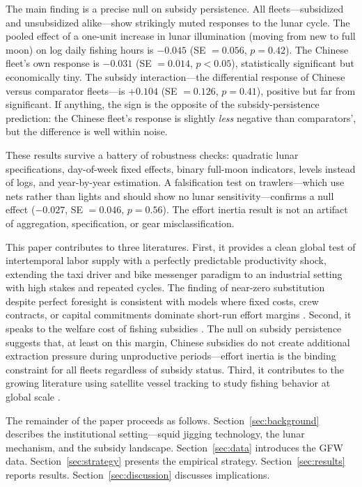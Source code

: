 \documentclass[12pt]{article}
\begin{document}
The main finding is a precise null on subsidy persistence. All fleets---subsidized and unsubsidized alike---show strikingly muted responses to the lunar cycle. The pooled effect of a one-unit increase in lunar illumination (moving from new to full moon) on log daily fishing hours is $-0.045$ (SE $= 0.056$, $p = 0.42$). The Chinese fleet's own response is $-0.031$ (SE $= 0.014$, $p < 0.05$), statistically significant but economically tiny. The subsidy interaction---the differential response of Chinese versus comparator fleets---is $+0.104$ (SE $= 0.126$, $p = 0.41$), positive but far from significant. If anything, the sign is the opposite of the subsidy-persistence prediction: the Chinese fleet's response is slightly \textit{less} negative than comparators', but the difference is well within noise.

These results survive a battery of robustness checks: quadratic lunar specifications, day-of-week fixed effects, binary full-moon indicators, levels instead of logs, and year-by-year estimation. A falsification test on trawlers---which use nets rather than lights and should show no lunar sensitivity---confirms a null effect ($-0.027$, SE $= 0.046$, $p = 0.56$). The effort inertia result is not an artifact of aggregation, specification, or gear misclassification.

This paper contributes to three literatures. First, it provides a clean global test of intertemporal labor supply with a perfectly predictable productivity shock, extending the taxi driver \citep{camerer1997, farber2005, farber2015} and bike messenger \citep{fehr2007} paradigm to an industrial setting with high stakes and repeated cycles. The finding of near-zero substitution despite perfect foresight is consistent with models where fixed costs, crew contracts, or capital commitments dominate short-run effort margins \citep{squires1987, homans1997}. Second, it speaks to the welfare cost of fishing subsidies \citep{sala2018, sumaila2019, costello2008, costello2016}. The null on subsidy persistence suggests that, at least on this margin, Chinese subsidies do not create additional extraction pressure during unproductive periods---effort inertia is the binding constraint for all fleets regardless of subsidy status. Third, it contributes to the growing literature using satellite vessel tracking to study fishing behavior at global scale \citep{kroodsma2018, park2023, burgess2018}.

The remainder of the paper proceeds as follows. Section~\ref{sec:background} describes the institutional setting---squid jigging technology, the lunar mechanism, and the subsidy landscape. Section~\ref{sec:data} introduces the GFW data. Section~\ref{sec:strategy} presents the empirical strategy. Section~\ref{sec:results} reports results. Section~\ref{sec:discussion} discusses implications.
\end{document}
